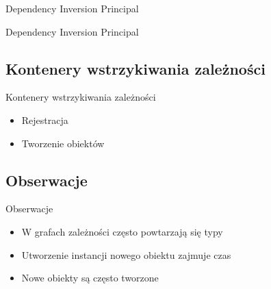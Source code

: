 \documentclass{beamer}
\begin{document}
\begin{frame}{Dependency Inversion Principal}
\begin{center}
Dependency Inversion Principal
\end{center}
\end{frame}


\subsection*{Kontenery wstrzykiwania zależności}

\begin{frame}{Kontenery wstrzykiwania zależności}
\begin{itemize}
	\item Rejestracja
	\item Tworzenie obiektów
\end{itemize}
\end{frame}

\subsection*{Obserwacje}

\begin{frame}{Obserwacje}
  \begin{itemize}
  \item W grafach zależności często powtarzają się typy
  \item Utworzenie instancji nowego obiektu zajmuje czas
  \item Nowe obiekty są często tworzone
  \end{itemize}
\end{frame}
\end{document}

